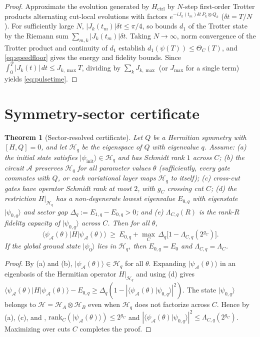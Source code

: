 \documentclass[reprint,aps,pra,floatfix,superscriptaddress,nofootinbib,longbibliography]{revtex4-2}
\newtheorem{theorem}{Theorem}
\theoremstyle{remark}
\theoremstyle{definition}
\newcommand{\calA}{\mathcal{A}}
\newcommand{\calH}{\mathcal{H}}
\newcommand{\ket}[1]{\lvert #1 \rangle}
\newcommand{\bra}[1]{\langle #1 \rvert}
\newcommand{\braket}[2]{\langle #1 \vert #2 \rangle}
\newcommand{\rank}{\mathrm{rank}}
\begin{document}
\begin{proof}
Approximate the evolution generated by $H_{\mathrm{ctrl}}$ by $N$-step
first-order Trotter products alternating
cut-local evolutions with factors $e^{-i J_k(t_m)\delta t\,P_k\otimes Q_k}$
($\delta t=T/N$). For sufficiently large $N$, $|J_k(t_m)|\delta t\le\pi/4$, so
 bounds $d_1$ of the Trotter state by the Riemann sum
$\sum_{m,k}|J_k(t_m)|\delta t$. Taking $N\to\infty$, norm convergence of the
Trotter product and continuity of $d_1$ establish $d_1(\psi(T))\le\Theta_C(T)$,
and \eqref{eq:speedfloor} gives the energy and fidelity bounds. Since
$\int_0^T|J_k(t)|\,dt\le J_{k,\max}T$, dividing by $\sum_k J_{k,\max}$ (or
$J_{\max}$ for a single term) yields \eqref{eq:pulsetime}.
\end{proof}

\section{Symmetry-sector certificate}
\label{app:sector}

\begin{theorem}[Sector-resolved certificate]
\label{thm:sector}
Let $Q$ be a Hermitian symmetry with $[H,Q]=0$, and let $\calH_q$ be the
eigenspace of $Q$ with eigenvalue $q$. Assume:
(a) the initial state satisfies $\ket{\psi_{\mathrm{init}}}\in\calH_q$ and has
Schmidt rank $1$ across $C$;
(b) the circuit $\calA$ preserves $\calH_q$ for all parameter values $\theta$
(sufficiently, every gate commutes with $Q$, or each variational layer maps
$\calH_q$ to itself);
(c) cross-cut gates have operator Schmidt rank at most $2$, with $g_C$ crossing
cut $C$;
(d) the restriction $H|_{\calH_q}$ has a non-degenerate lowest eigenvalue
$E_{0,q}$ with eigenstate $\ket{\psi_{0,q}}$ and sector gap
$\Delta_q:=E_{1,q}-E_{0,q}>0$; and
(e) $\Lambda_{C,q}(R)$ is the rank-$R$ fidelity capacity of $\ket{\psi_{0,q}}$
across $C$.
Then for all $\theta$,
\begin{equation}
  \bra{\psi_\calA(\theta)}H\ket{\psi_\calA(\theta)}
  \ \ge\ E_{0,q}+\max_C\,\Delta_q\bigl[1-\Lambda_{C,q}(2^{g_C})\bigr].
\end{equation}
If the global ground state $\ket{\psi_0}$ lies in $\calH_q$, then $E_{0,q}=E_0$
and $\Lambda_{C,q}=\Lambda_C$.
\end{theorem}

\begin{proof}
By (a) and (b), $\ket{\psi_\calA(\theta)}\in\calH_q$ for all $\theta$. Expanding
$\ket{\psi_\calA(\theta)}$ in an eigenbasis of the Hermitian operator
$H|_{\calH_q}$ and using (d) gives
$\bra{\psi_\calA(\theta)}H\ket{\psi_\calA(\theta)}-E_{0,q}\ge\Delta_q(1-|\braket{\psi_\calA(\theta)}{\psi_{0,q}}|^2)$.
The state $\ket{\psi_{0,q}}$ belongs to $\calH=\calH_A\otimes\calH_B$ even when
$\calH_q$ does not factorize across $C$. Hence by (a), (c), and
, $\rank_C(\ket{\psi_\calA(\theta)})\le2^{g_C}$ and
$|\braket{\psi_\calA(\theta)}{\psi_{0,q}}|^2\le\Lambda_{C,q}(2^{g_C})$.
Maximizing over cuts $C$ completes the proof.
\end{proof}
\end{document}

